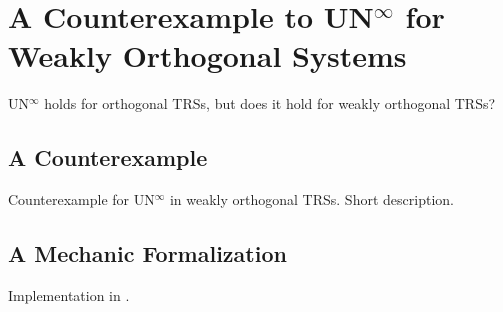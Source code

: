 \chapter{A Counterexample to \texorpdfstring{UN$^\infty$}{UN} for Weakly
  Orthogonal Systems}\label{chap:unwo}


UN$^\infty$ holds for orthogonal TRSs, but does it hold for weakly orthogonal TRSs?


\section{A Counterexample}

Counterexample for UN$^\infty$ in weakly orthogonal TRSs. Short description.


\section{A Mechanic Formalization}

Implementation in \Coq.
